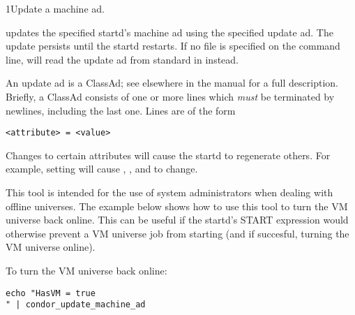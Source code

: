 \begin{ManPage}{}{1}{Update a machine ad.}
\label{man-condor-update-machine-ad}

\Synopsis {}

\Description
{} updates the specified startd's machine ad using
the specified update ad.  The update persists until the startd restarts.
If no file is specified on the command line, 
will read the update ad from standard in instead.

An update ad is a ClassAd; see elsewhere in the manual for a full
description. Briefly, a ClassAd consists of one or more lines which
\emph{must} be terminated by newlines, including the last one.  Lines
are of the form

\begin{verbatim}
<attribute> = <value>
\end{verbatim}

Changes to certain attributes will cause the startd to regenerate others.
For example, setting  will cause ,
, and  to change.

\begin{Options}
\end{Options}

\GenRem

This tool is intended for the use of system administrators when dealing
with offline universes.  The example below shows how to use this tool to
turn the VM universe back online.  This can be useful if the startd's START
expression would otherwise prevent a VM universe job from starting (and if
succesful, turning the VM universe online).

\Examples

To turn the VM universe back online:

\begin{verbatim}
echo "HasVM = true
" | condor_update_machine_ad
\end{verbatim}


\end{ManPage}
